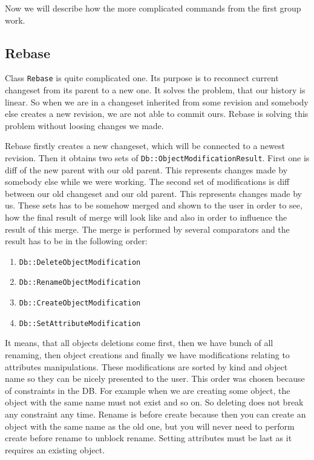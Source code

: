 \documentclass[deska]{subfiles}
\begin{document}
Now we will describe how the more complicated commands from the first group work.

\subsection{Rebase}

Class {\tt Rebase} is quite complicated one. Its purpose is to reconnect current changeset from its parent to a new
one. It solves the problem, that our history is linear. So when we are in a changeset inherited from some revision and
somebody else creates a new revision, we are not able to commit ours. Rebase is solving this problem without loosing
changes we made.

Rebase firstly creates a new changeset, which will be connected to a newest revision. Then it obtains two sets of
{\tt Db::ObjectModificationResult}. First one is diff of the new parent with our old parent. This represents changes
made by somebody else while we were working. The second set of modifications is diff between our old changeset and
our old parent. This represents changes made by us. These sets has to be somehow merged and shown to the user in order
to see, how the final result of merge will look like and also in order to influence the result of this merge.
The merge is performed by several comparators and the result has to be in the following order:
\begin{enumerate}
    \item {\tt Db::DeleteObjectModification}
    \item {\tt Db::RenameObjectModification}
    \item {\tt Db::CreateObjectModification}
    \item {\tt Db::SetAttributeModification}
\end{enumerate}
It means, that all objects deletions come first, then we have bunch of all renaming, then object creations and finally
we have modifications relating to attributes manipulations. These modifications are sorted by kind and object name so
they can be nicely presented to the user. This order was chosen because of constraints in the DB. For example when
we are creating some object, the object with the same name must not exist and so on. So deleting does not break any
constraint any time. Rename is before create because then you can create an object with the same name as the old one,
but you will never need to perform create before rename to unblock rename. Setting attributes must be last as it
requires an existing object.
\end{document}
